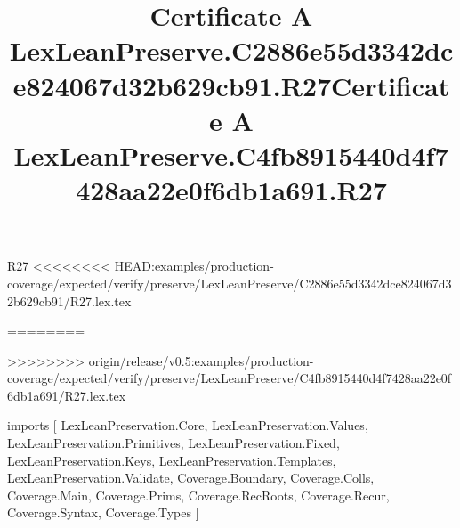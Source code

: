 \begin{lexlean}{R27}
<<<<<<<< HEAD:examples/production-coverage/expected/verify/preserve/LexLeanPreserve/C2886e55d3342dce824067d32b629cb91/R27.lex.tex
\title{Certificate A LexLeanPreserve.C2886e55d3342dce824067d32b629cb91.R27}
========
\title{Certificate A LexLeanPreserve.C4fb8915440d4f7428aa22e0f6db1a691.R27}
>>>>>>>> origin/release/v0.5:examples/production-coverage/expected/verify/preserve/LexLeanPreserve/C4fb8915440d4f7428aa22e0f6db1a691/R27.lex.tex
\begin{coremodule}
imports [
  LexLeanPreservation.Core,
  LexLeanPreservation.Values,
  LexLeanPreservation.Primitives,
  LexLeanPreservation.Fixed,
  LexLeanPreservation.Keys,
  LexLeanPreservation.Templates,
  LexLeanPreservation.Validate,
  Coverage.Boundary,
  Coverage.Colls,
  Coverage.Main,
  Coverage.Prims,
  Coverage.RecRoots,
  Coverage.Recur,
  Coverage.Syntax,
  Coverage.Types
]


\end{coremodule}
\end{lexlean}

